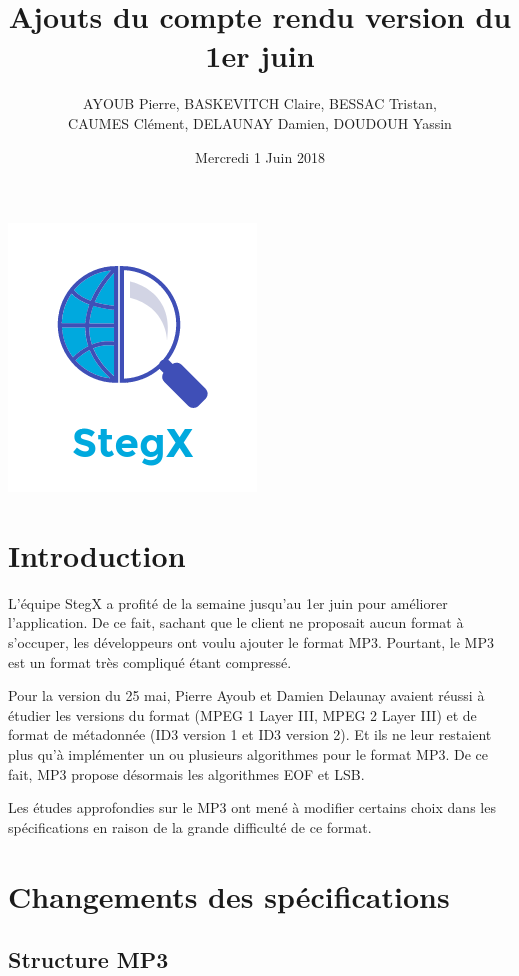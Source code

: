 \documentclass[11pt]{article}
\title{\huge{\textbf Ajouts du compte rendu version du 1{er} juin}}
\author{AYOUB Pierre, BASKEVITCH Claire, BESSAC Tristan, \\
CAUMES Clément, DELAUNAY Damien, DOUDOUH Yassin}
\date{Mercredi 1 Juin 2018}
\begin{document}
\maketitle
\vspace{20em}
\begin{center}\includegraphics{pictures/Application.png}\end{center}
\newpage

\section{Introduction}

L'équipe StegX a profité de la semaine jusqu'au 1er juin pour améliorer 
l'application. De ce fait, sachant que le client ne proposait aucun format 
à s'occuper, les développeurs ont voulu ajouter le format MP3. 
Pourtant, le MP3 est un format très compliqué étant compressé. 

Pour la version du 25 mai, Pierre Ayoub et Damien Delaunay avaient réussi à 
étudier les versions du format (MPEG 1 Layer III, MPEG 2 Layer III) et de 
format de métadonnée (ID3 version 1 et ID3 version 2). 
Et ils ne leur restaient plus qu'à implémenter un ou plusieurs algorithmes 
pour le format MP3. 
De ce fait, MP3 propose désormais les algorithmes EOF et LSB. 

Les études approfondies sur le MP3 ont mené à modifier certains choix dans 
les spécifications en raison de la grande difficulté de ce format. 

\section{Changements des spécifications}

\subsection{Structure MP3}
\end{document}
